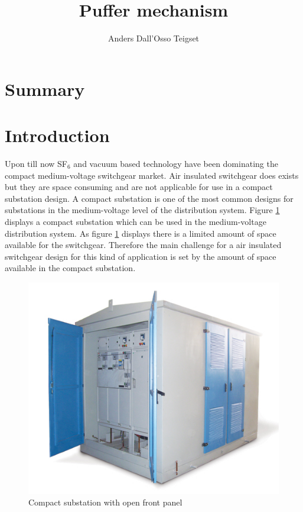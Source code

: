 \documentclass[10pt,a4paper]{article}
\author{Anders Dall'Osso Teigset}
\title{Puffer mechanism}
\begin{document}
\maketitle
\section{Summary}
\tableofcontents
\newpage
\section{Introduction}
Upon till now SF$_6$ and vacuum based technology have been dominating the compact medium-voltage switchgear market. Air insulated switchgear does exists but they are space consuming and are not applicable for use in a compact substation design. A compact substation is one of the most common designs for substations in the medium-voltage level of the distribution system. Figure \ref{fig:compact substation} displays a compact substation which can be used in the medium-voltage distribution system. As figure \ref{fig:compact substation} displays there is a limited amount of space available for the switchgear. Therefore the main challenge for a air insulated switchgear design for this kind of application is set by the amount of space available in the compact substation. 

\begin{figure} [h]
\centering
\includegraphics[scale=0.5]{Bilder/Introduction/general_substation.jpg}
\caption{Compact substation with open front panel} \label{fig:compact substation}
\end{figure}
\end{document}
